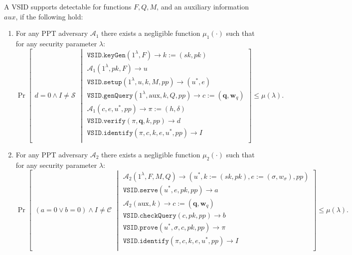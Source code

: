 \begin{definition}\label{def::VSID-Identifiable-Abort}  A  VSID  supports  detectable for functions $F,Q,M$, and an auxiliary information $aux$, if  the following hold: 

\begin{enumerate}
\item For any PPT adversary $\mathcal{A}_{\scriptscriptstyle 1}$ there exists a negligible function $\mu_{\scriptscriptstyle 1}(\cdot)$ such that for any  security parameter $\lambda$:
{\small
$$ \Pr\left[
  \begin{array}{l}
 d=0 \wedge I\neq\mathcal{S}
\end{array} \middle |
    \begin{array}{l}
    \mathtt{VSID.keyGen}(1^{\lambda},F)\rightarrow k:=(sk,pk)\\
    \mathcal{A}_{\scriptscriptstyle 1}(1^{\scriptscriptstyle\lambda},pk, F)\rightarrow u\\
    \mathtt{VSID.setup}(1^{\lambda}, u, k, M,{pp})\rightarrow (u^{\scriptscriptstyle *},e)\\
    \mathtt{VSID.genQuery}(1^{\lambda},  \text{aux},k,Q,{pp})\rightarrow c:=(\bm{q}, \bm{w}_{q})\\
     \mathcal{A}_{\scriptscriptstyle 1}(c,e, u^{\scriptscriptstyle *},{pp})\rightarrow \pi:=(h,\delta)\\
     \mathtt{VSID.verify}(\pi,\bm{q},k,{pp})\rightarrow d\\
     \mathtt{VSID.identify}(\pi,c,k,e,u^{\scriptscriptstyle *},{pp})\rightarrow I\\
\end{array}    \right]\leq \mu(\lambda).$$
}

\item For any PPT adversary $\mathcal{A}_{\scriptscriptstyle 2}$ there exists a negligible function $\mu_{\scriptscriptstyle 2}(\cdot)$ such that for any  security parameter $\lambda$:
{\small
$$ \Pr\left[
  \begin{array}{l}
 (a=0 \vee b=0)\wedge I\neq\mathcal{C}
\end{array} \middle |
    \begin{array}{l}
    
    \mathcal{A}_{\scriptscriptstyle 2}(1^{\scriptscriptstyle\lambda},F,M,Q)\rightarrow (u^{\scriptscriptstyle *},k:=(sk,pk),e:=(\sigma,w_{\sigma}),{pp})\\
    \mathtt{VSID.serve}(u^{\scriptscriptstyle *},e,pk,{pp})\rightarrow a\\
       \mathcal{A}_{\scriptscriptstyle 2}(\text{aux},k)\rightarrow c:=(\bm{q},\bm{w}_{\scriptscriptstyle q})\\
    \mathtt{VSID.checkQuery}(c, pk,{pp})\rightarrow b\\
    \mathtt{VSID.prove}(u^{\scriptscriptstyle *},\sigma,c,pk,{pp})\rightarrow \pi\\
    \mathtt{VSID.identify}(\pi,c,k,e,u^{\scriptscriptstyle *},{pp})\rightarrow I\\
\end{array}    \right]\leq \mu(\lambda).$$
}

\end{enumerate}
\end{definition}
